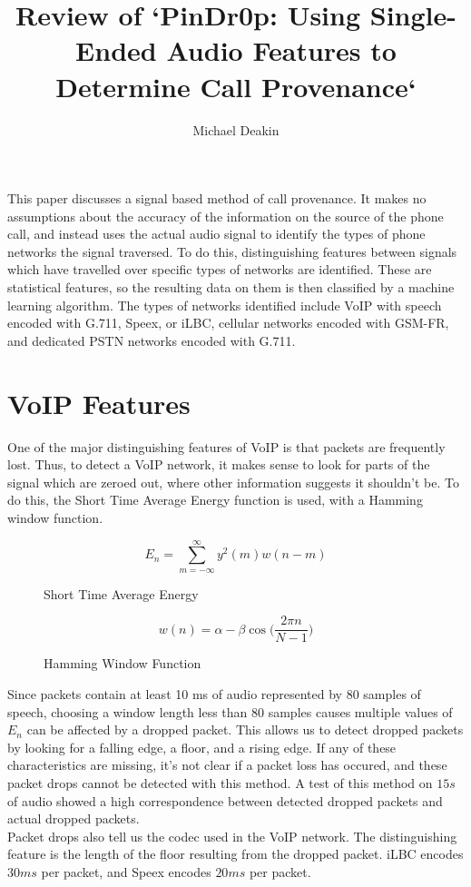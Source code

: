 \documentclass{article}
\title{Review of `PinDr0p: Using Single-Ended Audio Features to Determine Call Provenance`}
\author{Michael Deakin}
\begin{document}
\maketitle
This paper discusses a signal based method of call provenance.
It makes no assumptions about the accuracy of the information on the source of the phone call,
and instead uses the actual audio signal to identify the types of phone networks the signal traversed.
To do this, distinguishing features between signals which have travelled over specific types of networks are identified.
These are statistical features, so the resulting data on them is then classified by a machine learning algorithm.
The types of networks identified include VoIP with speech encoded with G.711, Speex, or iLBC,
cellular networks encoded with GSM-FR,
and dedicated PSTN networks encoded with G.711.
\section{VoIP Features}
One of the major distinguishing features of VoIP is that packets are frequently lost.
Thus, to detect a VoIP network, it makes sense to look for parts of the signal which are zeroed out,
where other information suggests it shouldn't be.
To do this, the Short Time Average Energy function is used, with a Hamming window function.
\begin{figure}[h]
  \[ E_n=\sum_{m=-\infty}^{\infty}y^2(m) w(n-m) \]
  \caption{Short Time Average Energy}
\end{figure}
\begin{figure}[h]
  \[ w(n)=\alpha - \beta \cos\Big(\frac{2\pi n}{N - 1}\Big) \]
  \caption{Hamming Window Function}
\end{figure}
Since packets contain at least 10 ms of audio represented by 80 samples of speech,
choosing a window length less than 80 samples causes multiple values of $E_n$ can be affected by a dropped packet.
This allows us to detect dropped packets by looking for a falling edge, a floor, and a rising edge.
If any of these characteristics are missing, it's not clear if a packet loss has occured,
and these packet drops cannot be detected with this method.
A test of this method on $15 s$ of audio showed a high correspondence between detected dropped packets and actual dropped packets.\\
Packet drops also tell us the codec used in the VoIP network.
The distinguishing feature is the length of the floor resulting from the dropped packet.
iLBC encodes $30 ms$ per packet, and Speex encodes $20 ms$ per packet.
\end{document}
